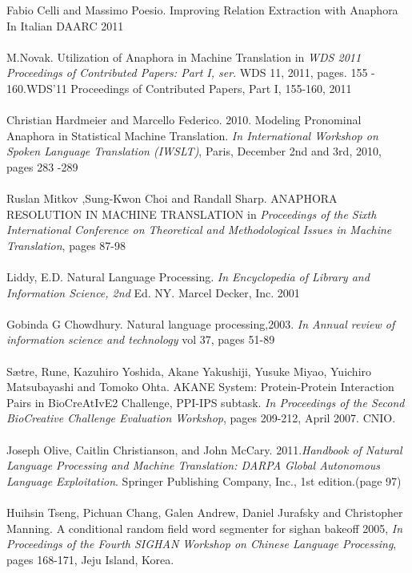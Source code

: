 \big[9\big]  Fabio Celli and Massimo Poesio. Improving Relation Extraction with Anaphora In Italian DAARC 2011\\  \\
\big[10\big] M.Novak. Utilization of Anaphora in Machine Translation in \emph{WDS 2011 Proceedings of Contributed Papers: Part I, ser}. WDS 11, 2011, pages. 155 - 160.WDS'11 Proceedings of Contributed Papers, Part I, 155-160, 2011 \\  \\
\big[11\big] Christian Hardmeier and Marcello Federico. 2010. Modeling Pronominal Anaphora in Statistical Machine Translation. \emph{In International Workshop on Spoken Language Translation (IWSLT)}, Paris, December 2nd and 3rd, 2010, pages 283 -289\\  \\
\big[12\big] Ruslan Mitkov ,Sung-Kwon Choi and Randall Sharp. ANAPHORA RESOLUTION IN MACHINE TRANSLATION in \emph{Proceedings of the Sixth International Conference on Theoretical and Methodological Issues in Machine Translation}, pages 87-98 \\  \\
\big[13\big] Liddy, E.D. Natural Language Processing. \emph{In Encyclopedia of Library and Information Science, 2nd} Ed. NY. Marcel Decker, Inc. 2001\\  \\
\big[14\big] Gobinda G Chowdhury. Natural language processing,2003. \emph{In Annual review of information science and technology} vol 37, pages 51-89\\  \\
\big[15\big]  Sætre, Rune, Kazuhiro Yoshida, Akane Yakushiji, Yusuke Miyao, Yuichiro Matsubayashi and Tomoko Ohta. AKANE System: Protein-Protein Interaction Pairs in BioCreAtIvE2 Challenge, PPI-IPS subtask. \emph{In Proceedings of the Second BioCreative Challenge Evaluation Workshop}, pages 209-212, April 2007. CNIO. \\  \\
\big[16\big] Joseph Olive, Caitlin Christianson, and John McCary. 2011.\emph{Handbook of Natural Language Processing and Machine Translation: DARPA Global Autonomous Language Exploitation}. Springer Publishing Company, Inc., 1st edition.(page 97) \\  \\
\big[17\big] Huihsin Tseng, Pichuan Chang, Galen Andrew, Daniel Jurafsky and  Christopher Manning. A conditional random field word segmenter for sighan bakeoff 2005,  \emph{In Proceedings of the Fourth SIGHAN Workshop on Chinese Language Processing}, pages 168-171, Jeju Island, Korea.\\  \\
